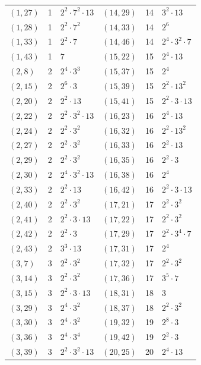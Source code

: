 \documentclass[11pt]{article}
\begin{document}
\begin{longtable}{@{}lrl@{\qquad}lrl@{}}
$(1,27)$ & 1 & $2^{2}\cdot 7^{2}\cdot 13$ & $(14,29)$ & 14 & $3^{2}\cdot 13$\\
$(1,28)$ & 1 & $2^{2}\cdot 7^{2}$ & $(14,33)$ & 14 & $2^{6}$\\
$(1,33)$ & 1 & $2^{2}\cdot 7$ & $(14,46)$ & 14 & $2^{4}\cdot 3^{2}\cdot 7$\\
$(1,43)$ & 1 & $7$ & $(15,22)$ & 15 & $2^{4}\cdot 13$\\
$(2,8)$ & 2 & $2^{4}\cdot 3^{3}$ & $(15,37)$ & 15 & $2^{4}$\\
$(2,15)$ & 2 & $2^{6}\cdot 3$ & $(15,39)$ & 15 & $2^{2}\cdot 13^{2}$\\
$(2,20)$ & 2 & $2^{2}\cdot 13$ & $(15,41)$ & 15 & $2^{2}\cdot 3\cdot 13$\\
$(2,22)$ & 2 & $2^{2}\cdot 3^{2}\cdot 13$ & $(16,23)$ & 16 & $2^{4}\cdot 13$\\
$(2,24)$ & 2 & $2^{2}\cdot 3^{2}$ & $(16,32)$ & 16 & $2^{2}\cdot 13^{2}$\\
$(2,27)$ & 2 & $2^{2}\cdot 3^{2}$ & $(16,33)$ & 16 & $2^{2}\cdot 13$\\
$(2,29)$ & 2 & $2^{2}\cdot 3^{2}$ & $(16,35)$ & 16 & $2^{2}\cdot 3$\\
$(2,30)$ & 2 & $2^{4}\cdot 3^{2}\cdot 13$ & $(16,38)$ & 16 & $2^{4}$\\
$(2,33)$ & 2 & $2^{2}\cdot 13$ & $(16,42)$ & 16 & $2^{2}\cdot 3\cdot 13$\\
$(2,40)$ & 2 & $2^{2}\cdot 3^{2}$ & $(17,21)$ & 17 & $2^{2}\cdot 3^{2}$\\
$(2,41)$ & 2 & $2^{2}\cdot 3\cdot 13$ & $(17,22)$ & 17 & $2^{2}\cdot 3^{2}$\\
$(2,42)$ & 2 & $2^{2}\cdot 3$ & $(17,29)$ & 17 & $2^{2}\cdot 3^{4}\cdot 7$\\
$(2,43)$ & 2 & $3^{3}\cdot 13$ & $(17,31)$ & 17 & $2^{4}$\\
$(3,7)$ & 3 & $2^{2}\cdot 3^{2}$ & $(17,32)$ & 17 & $2^{2}\cdot 3^{2}$\\
$(3,14)$ & 3 & $2^{2}\cdot 3^{2}$ & $(17,36)$ & 17 & $3^{5}\cdot 7$\\
$(3,15)$ & 3 & $2^{2}\cdot 3\cdot 13$ & $(18,31)$ & 18 & $3$\\
$(3,29)$ & 3 & $2^{4}\cdot 3^{2}$ & $(18,37)$ & 18 & $2^{2}\cdot 3^{2}$\\
$(3,30)$ & 3 & $2^{4}\cdot 3^{2}$ & $(19,32)$ & 19 & $2^{8}\cdot 3$\\
$(3,36)$ & 3 & $2^{4}\cdot 3^{4}$ & $(19,42)$ & 19 & $2^{2}\cdot 3$\\
$(3,39)$ & 3 & $2^{2}\cdot 3^{2}\cdot 13$ & $(20,25)$ & 20 & $2^{4}\cdot 13$\\

\end{longtable}
\end{document}
